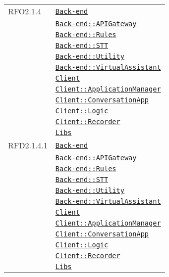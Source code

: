 \begin{longtable}{|>{\centering}m{3cm}|m{10cm}<{\centering}|}
RFO2.1.4 & \hyperref[Back-end]{\texttt{Back-end}}\\
& \hyperref[Back-end::APIGateway]{\texttt{Back-end::APIGateway}}\\
& \hyperref[Back-end::Rules]{\texttt{Back-end::Rules}}\\
& \hyperref[Back-end::STT]{\texttt{Back-end::STT}}\\
& \hyperref[Back-end::Utility]{\texttt{Back-end::Utility}}\\
& \hyperref[Back-end::VirtualAssistant]{\texttt{Back-end::VirtualAssistant}}\\
& \hyperref[Client]{\texttt{Client}}\\
& \hyperref[Client::ApplicationManager]{\texttt{Client::ApplicationManager}}\\
& \hyperref[Client::ConversationApp]{\texttt{Client::ConversationApp}}\\
& \hyperref[Client::Logic]{\texttt{Client::Logic}}\\
& \hyperref[Client::Recorder]{\texttt{Client::Recorder}}\\
& \hyperref[Libs]{\texttt{Libs}}\\ \hline

RFD2.1.4.1 & \hyperref[Back-end]{\texttt{Back-end}}\\
& \hyperref[Back-end::APIGateway]{\texttt{Back-end::APIGateway}}\\
& \hyperref[Back-end::Rules]{\texttt{Back-end::Rules}}\\
& \hyperref[Back-end::STT]{\texttt{Back-end::STT}}\\
& \hyperref[Back-end::Utility]{\texttt{Back-end::Utility}}\\
& \hyperref[Back-end::VirtualAssistant]{\texttt{Back-end::VirtualAssistant}}\\
& \hyperref[Client]{\texttt{Client}}\\
& \hyperref[Client::ApplicationManager]{\texttt{Client::ApplicationManager}}\\
& \hyperref[Client::ConversationApp]{\texttt{Client::ConversationApp}}\\
& \hyperref[Client::Logic]{\texttt{Client::Logic}}\\
& \hyperref[Client::Recorder]{\texttt{Client::Recorder}}\\
& \hyperref[Libs]{\texttt{Libs}}\\ \hline


\end{longtable}
